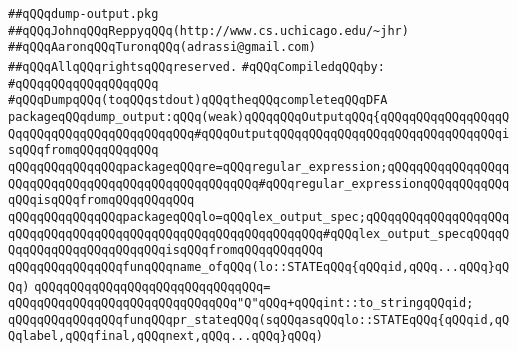 \label{src/app/future-lex/src/backends/dump/dump-output.pkg}
\verb|##qQQqdump-output.pkg|\newline
\verb|##qQQqJohnqQQqReppyqQQq(http://www.cs.uchicago.edu/~jhr)|\newline
\verb|##qQQqAaronqQQqTuronqQQq(adrassi@gmail.com)|\newline
\verb|##qQQqAllqQQqrightsqQQqreserved.|\newline
\newline
\verb|#qQQqCompiledqQQqby:|\newline
\verb|#qQQqqQQqqQQqqQQqqQQq|\newline
\newline
\newline
\newline
\newline
\verb|#qQQqDumpqQQq(toqQQqstdout)qQQqtheqQQqcompleteqQQqDFA|\newline
\newline
\verb|packageqQQqdump_output:qQQq(weak)qQQqqQQqOutputqQQq{qQQqqQQqqQQqqQQqqQQqqQQqqQQqqQQqqQQqqQQqqQQq#qQQqOutputqQQqqQQqqQQqqQQqqQQqqQQqqQQqqQQqisqQQqfromqQQqqQQqqQQq|\newline
\newline
\verb|qQQqqQQqqQQqqQQqpackageqQQqre=qQQqregular_expression;qQQqqQQqqQQqqQQqqQQqqQQqqQQqqQQqqQQqqQQqqQQqqQQqqQQq#qQQqregular_expressionqQQqqQQqqQQqqQQqisqQQqfromqQQqqQQqqQQq|\newline
\verb|qQQqqQQqqQQqqQQqpackageqQQqlo=qQQqlex_output_spec;qQQqqQQqqQQqqQQqqQQqqQQqqQQqqQQqqQQqqQQqqQQqqQQqqQQqqQQqqQQqqQQq#qQQqlex_output_specqQQqqQQqqQQqqQQqqQQqqQQqqQQqisqQQqfromqQQqqQQqqQQq|\newline
\newline
\verb|qQQqqQQqqQQqqQQqfunqQQqname_ofqQQq(lo::STATEqQQq{qQQqid,qQQq...qQQq}qQQq)|\newline
\verb|qQQqqQQqqQQqqQQqqQQqqQQqqQQqqQQq=|\newline
\verb|qQQqqQQqqQQqqQQqqQQqqQQqqQQqqQQq"Q"qQQq+qQQqint::to_stringqQQqid;|\newline
\newline
\verb|qQQqqQQqqQQqqQQqfunqQQqpr_stateqQQq(sqQQqasqQQqlo::STATEqQQq{qQQqid,qQQqlabel,qQQqfinal,qQQqnext,qQQq...qQQq}qQQq)|\newline
